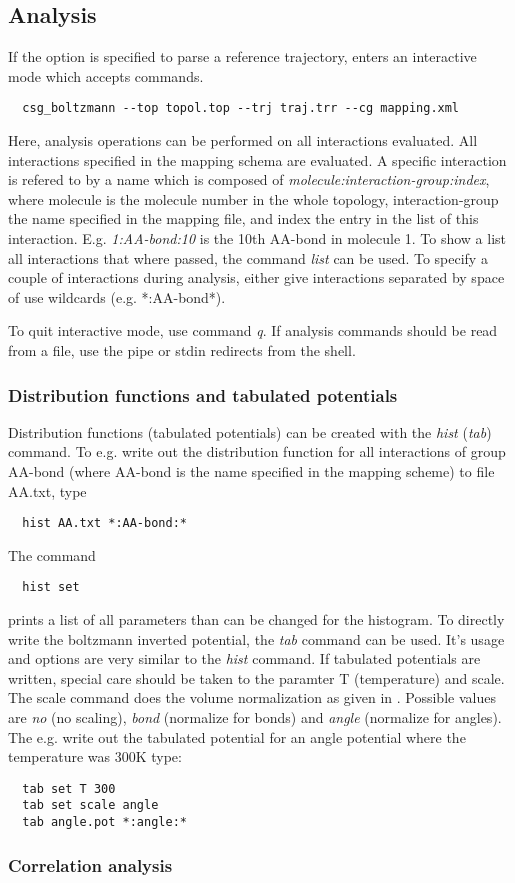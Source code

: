 \subsection{Analysis}
If the  option is specified to parse a reference trajectory,  enters an interactive mode which accepts commands.

\begin{verbatim}
  csg_boltzmann --top topol.top --trj traj.trr --cg mapping.xml 
\end{verbatim}

Here, analysis operations can be performed on all interactions evaluated. All interactions specified in the mapping schema are evaluated. A specific interaction is refered to by a name which is composed of \textit{molecule:interaction-group:index}, where molecule is the molecule number in the whole topology, interaction-group the name specified in the mapping file, and index the entry in the list of this interaction. E.g. \textit{1:AA-bond:10} is the 10th AA-bond in molecule 1. To show a list all interactions that where passed, the command \textit{list} can be used. To specify a couple of interactions during analysis, either give interactions separated by space of use wildcards (e.g. *:AA-bond*).

To quit interactive mode, use command \textit{q}. If analysis commands should be read from a file, use the pipe or stdin redirects from the shell.

\subsubsection{Distribution functions and tabulated potentials}
Distribution functions (tabulated potentials) can be created with the \textit{hist} (\textit{tab}) command.
To e.g. write out the distribution function for all interactions of group AA-bond (where AA-bond is the name specified in the mapping scheme) to file AA.txt, type
\begin{verbatim}
  hist AA.txt *:AA-bond:*   
\end{verbatim}
The command
\begin{verbatim}
  hist set
\end{verbatim}
prints a list of all parameters than can be changed for the histogram. To directly write the boltzmann inverted potential, the \textit{tab} command can be used. It's usage and options are very similar to the \textit{hist} command. If tabulated potentials are written, special care should be taken to the paramter T (temperature) and scale. The scale command does the volume normalization as given in     . Possible values are \textit{no} (no scaling), \textit{bond} (normalize for bonds) and \textit{angle} (normalize for angles). The e.g. write out the tabulated potential for an angle potential where the temperature was 300K type:
\begin{verbatim}
  tab set T 300
  tab set scale angle
  tab angle.pot *:angle:*
\end{verbatim}

\subsubsection{Correlation analysis}
